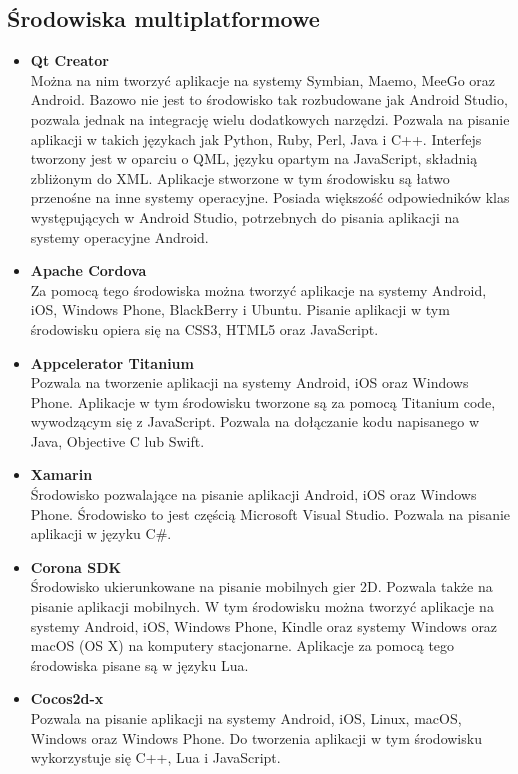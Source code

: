 \documentclass[archivemod, eng]{mgr}
\begin{document}
			\subsection{Środowiska multiplatformowe}
			\begin{itemize}
				\item \textbf{Qt Creator}\\
				Można na nim tworzyć aplikacje na systemy Symbian, Maemo, MeeGo oraz Android. Bazowo nie jest to środowisko tak rozbudowane jak Android Studio, pozwala jednak na integrację wielu dodatkowych narzędzi. Pozwala na pisanie aplikacji w takich językach jak Python, Ruby, Perl, Java i C++. Interfejs tworzony jest w oparciu o QML, języku opartym na JavaScript, składnią zbliżonym do XML. Aplikacje stworzone w tym środowisku są łatwo przenośne na inne systemy operacyjne. Posiada większość odpowiedników klas występujących w Android Studio, potrzebnych do pisania aplikacji na systemy operacyjne Android.
				
				\item \textbf{Apache Cordova}\\
				Za pomocą tego środowiska można tworzyć aplikacje na systemy Android, iOS, Windows Phone, BlackBerry i Ubuntu. Pisanie aplikacji w tym środowisku opiera się na CSS3, HTML5 oraz JavaScript.
				
				\item \textbf{Appcelerator Titanium}\\
				Pozwala na tworzenie aplikacji na systemy Android, iOS oraz Windows Phone. Aplikacje w tym środowisku tworzone są za pomocą Titanium code, wywodzącym się z JavaScript. Pozwala na dołączanie kodu napisanego w Java, Objective C lub Swift.
				
				\item \textbf{Xamarin}\\
				Środowisko pozwalające na pisanie aplikacji Android, iOS oraz Windows Phone. Środowisko to jest częścią Microsoft Visual Studio. Pozwala na pisanie aplikacji w języku C\#.
				
				\item \textbf{Corona SDK}\\
				Środowisko ukierunkowane na pisanie mobilnych gier 2D. Pozwala także na pisanie aplikacji mobilnych. W tym środowisku można tworzyć aplikacje na systemy Android, iOS, Windows Phone, Kindle oraz systemy Windows oraz macOS (OS X) na komputery stacjonarne. Aplikacje za pomocą tego środowiska pisane są w języku Lua.
				
				\item \textbf{Cocos2d-x}\\
				Pozwala na pisanie aplikacji na systemy Android, iOS, Linux, macOS, Windows oraz Windows Phone. Do tworzenia aplikacji w tym środowisku wykorzystuje się C++, Lua i JavaScript.
				

\end{itemize}
\end{document}
